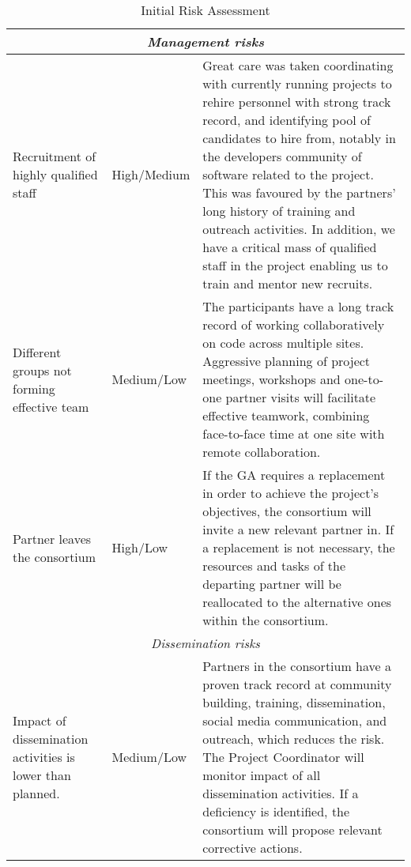 \begin{table}
\begin{center}
\begin{tabular}{|m{}|m{}|m{}|}
  \multicolumn{3}{|c|}{
    \textit{Management risks}
  }
  \\\hline

  Recruitment of highly qualified staff & High/Medium &

  Great care was taken coordinating with currently running projects to
  rehire personnel with strong track record, and identifying pool of
  candidates to hire from, notably in the developers community of
  software related to the project. This was favoured by the partners'
  long history of training and outreach activities. In addition, we
  have a critical mass of qualified staff in the project enabling us
  to train and mentor new recruits.

 \\\hline

  Different groups not forming effective team & Medium/Low & The participants have a long
  track record of working collaboratively on code across multiple
  sites. Aggressive planning of project meetings, workshops and
  one-to-one partner visits will facilitate effective teamwork,
  combining face-to-face time at one site with remote
  collaboration.\\\hline

  Partner leaves the consortium & High/Low & If the GA requires a replacement
  in order to achieve the project's objectives, the consortium will invite a new
  relevant partner in. If a replacement is not necessary, the resources and tasks
  of the departing partner will be reallocated to the alternative ones within the
  consortium.
  \\\hline

  \multicolumn{3}{|c|}{
    \textit{Dissemination risks}
  }
  \\\hline

  Impact of dissemination activities is lower than planned. & Medium/Low &

  Partners in the consortium have a proven track record at community
  building, training, dissemination, social media communication, and
  outreach, which reduces the risk. The Project Coordinator
  will monitor impact of all dissemination activities. If a deficiency is identified, the consortium
  will propose relevant corrective actions.\\\hline

  \end{tabular}
\end{center}
\caption{\label{risk-table}Initial Risk Assessment}
\end{table}
\fi


